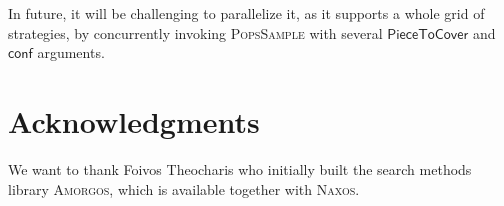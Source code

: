 \documentclass{ws-ijait}
\begin{document}
In future, it will be challenging to parallelize it, as it
supports a whole grid of strategies, by concurrently
invoking \textsc{PopsSample} with several
$\mathsf{PieceToCover}$ and $\mathsf{conf}$ arguments.


\section*{Acknowledgments}

We want to thank Foivos Theocharis who initially built the
search methods library \textsc{Amorgos}, which is available
together with \textsc{Naxos}.\cite{naxos-solver}



\end{document}

